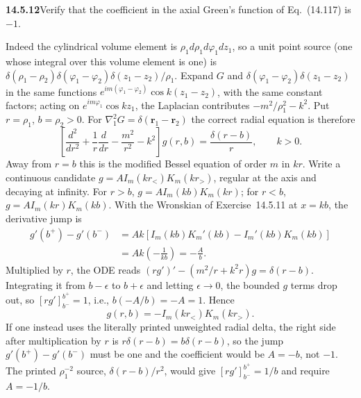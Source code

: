 \par\bigskip
\noindent\textbf{14.5.12}\quad Verify that the coefficient in the axial
Green's function of Eq.~(14.117) is $-1$.
\par{}
\solution
{}
Indeed the cylindrical volume element is
$\rho_1d\rho_1d\varphi_1dz_1$, so a unit point source (one whose
integral over this volume element is one) is
$\delta(\rho_1-\rho_2)\delta(\varphi_1-\varphi_2)
\delta(z_1-z_2)/\rho_1$.
Expand $G$ and $\delta(\varphi_1-\varphi_2)\delta(z_1-z_2)$ in the
same functions $e^{im(\varphi_1-\varphi_2)}\cos k(z_1-z_2)$, with
the same constant factors; acting on $e^{im\varphi_1}\cos kz_1$,
the Laplacian contributes $-m^2/\rho_1^2-k^2$. Put $r=\rho_1$,
$b=\rho_2>0$. For $\nabla_1^2G=\delta(\mathbf r_1-\mathbf r_2)$
the correct radial equation is therefore
\[
\left[\frac{d^2}{dr^2}+\frac1r\frac d{dr}
-\frac{m^2}{r^2}-k^2\right]g(r,b)=\frac{\delta(r-b)}r,
\qquad k>0.
\]
Away from $r=b$ this is the modified Bessel equation of order $m$
in $kr$. Write a continuous candidate
$g=A I_m(kr_<)K_m(kr_>)$, regular at the axis and decaying at
infinity. For $r>b$, $g=AI_m(kb)K_m(kr)$; for $r<b$,
$g=AI_m(kr)K_m(kb)$. With the Wronskian of Exercise~14.5.11 at
$x=kb$, the derivative jump is
\begin{align*}
g'(b^+)-g'(b^-)
&=Ak[I_m(kb)K_m'(kb)-I_m'(kb)K_m(kb)]\\
&=Ak\left(-\frac1{kb}\right)=-\frac Ab.
\end{align*}
Multiplied by $r$, the ODE reads
$(rg')'-(m^2/r+k^2r)g=\delta(r-b)$. Integrating it from $b-\epsilon$
to $b+\epsilon$ and letting $\epsilon\to0$, the bounded $g$ terms
drop out, so $[rg']_{b^-}^{b^+}=1$, i.e., $b(-A/b)=-A=1$. Hence
\[
\boxed{g(r,b)=-I_m(kr_<)K_m(kr_>)}.
\]
If one instead uses the literally printed unweighted radial delta,
the right side after multiplication by $r$ is
$r\delta(r-b)=b\delta(r-b)$, so the jump $g'(b^+)-g'(b^-)$ must be
one and the coefficient would be $A=-b$, not $-1$. The printed
$\rho_1^{-2}$ source, $\delta(r-b)/r^2$, would give
$[rg']_{b^-}^{b^+}=1/b$ and require $A=-1/b$.


